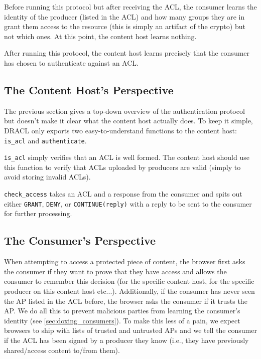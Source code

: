 \documentclass[pdftex,12pt,a4papaer,twoside,notitlepage]{report}
\begin{document}
Before running this protocol but after receiving the ACL, the consumer learns
the identity of the producer (listed in the ACL) and how many groups they are in
grant them access to the resource (this is simply an artifact of the crypto) but
not which ones. At this point, the content host learns nothing.

After running this protocol, the content host learns precisely that the consumer
has chosen to authenticate against an ACL.

\subsection{The Content Host's Perspective}

The previous section gives a top-down overview of the authentication protocol
but doesn't make it clear what the content host actually does. To keep it
simple, DRACL only exports two easy-to-understand functions to the content host:
\verb=is_acl= and \verb=authenticate=.

\verb=is_acl= simply verifies that an ACL is well formed. The content host
should use this function to verify that ACLs uploaded by producers are valid
(simply to avoid storing invalid ACLs).

\verb=check_access= takes an ACL and a response from the consumer and spits out
either \verb=GRANT=, \verb=DENY=, or \verb=CONTINUE(reply)= with a reply to be
sent to the consumer for further processing.

\subsection{The Consumer's Perspective}
\label{sec:consumer_perspective}

When attempting to access a protected piece of content, the browser first asks
the consumer if they want to prove that they have access and allows the consumer
to remember this decision (for the specific content host, for the specific
producer on this content host etc...). Additionally, if the consumer has never
seen the AP listed in the ACL before, the browser asks the consumer if it trusts
the AP. We do all this to prevent malicious parties from learning the consumer's
identity (see \cref{sec:doxing_consumers}). To make this less of a pain, we
expect browsers to ship with lists of trusted and untrusted APs and we tell the
consumer if the ACL has been signed by a producer they know (i.e., they have
previously shared/access content to/from them).
\end{document}
